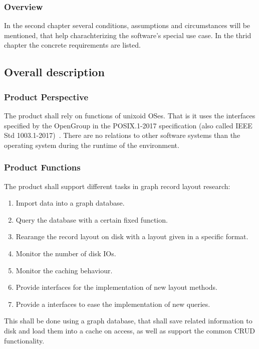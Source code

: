 	\subsubsection{Overview}
		In the second chapter several conditions, assumptions and circumstances will be mentioned, that help charachterizing the software's special use case. In the thrid chapter the concrete requirements are listed.

		
\subsection{Overall description}
	\subsubsection{Product Perspective}
		The product shall rely on functions of unixoid OSes. 
		That is it uses the interfaces specified by the OpenGroup in the POSIX.1-2017 specification (also called IEEE Std 1003.1-2017)~\autocite{posix}.
		There are no relations to other software systems than the operating system during the runtime of the environment.

	\subsubsection{Product Functions}
	The product shall support different tasks in graph record layout research: 
		\begin{enumerate}
		 \item Import data into a graph database.
		 \item Query the database with a certain fixed function.
		 \item Rearange the record layout on disk with a layout given in a specific format.
		 \item Monitor the number of disk IOs.
		 \item Monitor the caching behaviour.
		 \item Provide interfaces for the implementation of new layout methods.
		 \item Provide a interfaces to ease the implementation of new queries.
		\end{enumerate}
		
        This shall be done using a graph database, that shall save related information to disk and load them into a cache on access, as well as support the common CRUD functionality. \\
        

